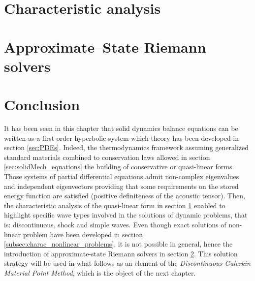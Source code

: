 \section{Characteristic analysis}
\label{sec:characteristic_analysis}



\section{Approximate--State Riemann solvers}
\label{sec:riemann_solvers}


\section*{Conclusion}
It has been seen in this chapter that solid dynamics balance equations can be written as a first order hyperbolic system which theory has been developed in section \ref{sec:PDEs}. Indeed, the thermodynamics framework assuming generalized standard materials combined to conservation laws allowed in section \ref{sec:solidMech_equations} the building of conservative or quasi-linear forms. Those systems of partial differential equations admit non-complex eigenvalues and independent eigenvectors providing that some requirements on the stored energy function are satisfied (positive definiteness of the acoustic tensor). Then, the characteristic analysis of the quasi-linear form in section \ref{sec:characteristic_analysis} enabled to highlight specific wave types involved in the solutions of dynamic problems, that is: discontinuous, shock and simple waves. Even though exact solutions of non-linear problem have been developed in section \ref{subsec:charac_nonlinear_problems}, it is not possible in general, hence the introduction of approximate-state Riemann solvers in section \ref{sec:riemann_solvers}. This solution strategy will be used in what follows as an element of the \textit{Discontinuous Galerkin Material Point Method}, which is the object of the next chapter.

